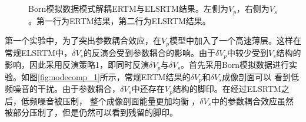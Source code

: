 \begin{figure}[!htb]
   \centering
   \\
   \\
   \caption{Born模拟数据模式解耦ERTM与ELSRTM结果。左侧为$V_p$，右侧为$V_s$。第一行为ERTM结果，第二行为ELSRTM结果。}
   \label{fig:decomp_1}
\end{figure}

第一个实验中，为了突出参数耦合效应，在$V_p$模型中加入了一个高速薄层。这样在常规ELSRTM中，$\delta
V_s$的反演会受到参数耦合的影响。由于$\delta V_p$中较少受到$V_s$结构的影响，因此采用反演策略1，即同时反演$\delta
V_p$与$\delta
V_s$。首先采用Born模拟数据进行实验。如图\ref{fig:nodecomp_1}所示，常规ERTM结果的$\delta
V_p$和$\delta V_s$成像剖面可以
看到低频噪音的干扰。由于参数耦合，$\delta
V_s$中还存在$V_p$结构的脚印。在经过ELSRTM之后，低频噪音被压制，
整个成像剖面能量更加均衡
，$\delta V_s$中的参数耦合效应虽然被部分压制了，但是仍然可以看到残留的脚印。

